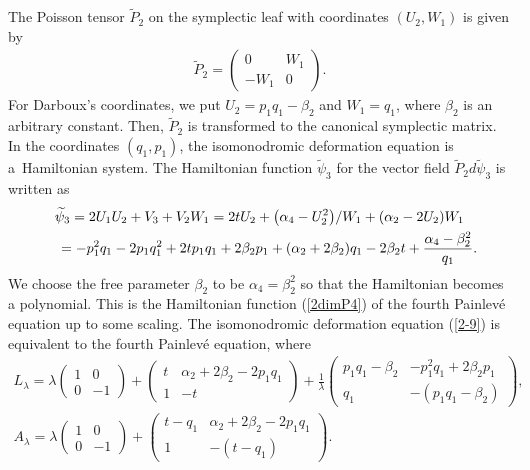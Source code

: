\documentclass[10pt,a4paper]{amsart}
\numberwithin{equation}{section}
\begin{document}
The Poisson tensor $\widetilde{P}_2$ on the symplectic leaf with coordinates $(U_2,W_1)$ is given by
\begin{gather*}
\widetilde{P}_2 = \left(
\begin{matrix}
0 & W_1 \\
-W_1 & 0
\end{matrix}
\right).
\end{gather*}
For Darboux's coordinates, we put $U_2 = p_1q_1 - \beta_2$ and $W_1 = q_1$, where $\beta_2$ is an arbitrary constant. Then, $\widetilde{P}_2$ is transformed to the canonical symplectic matrix. In the coordinates $(q_1, p_1)$, the isomonodromic deformation equation is a~Hamiltonian system. The Hamiltonian function $\widetilde{\psi}_3$ for the vector f\/ield $\widetilde{P}_2d\widetilde{\psi}_3$ is written as
\begin{gather*}
\widetilde{\psi}_3 = 2U_1U_2 + V_3 + V_2W_1 = 2t U_2 + \big(\alpha _4-U_2^2\big)/W_1 + (\alpha _2 - 2U_2)W_1 \\
\hphantom{\widetilde{\psi}_3}{} = -p_1^2 q_1 - 2p_1q_1^2 + 2t p_1q_1 + 2\beta_2 p_1 + (\alpha _2 + 2\beta_2) q_1 - 2\beta_2 t + \frac{\alpha _4-\beta_2^2}{q_1}.
\end{gather*}
We choose the free parameter $\beta_2$ to be $\alpha _4 = \beta_2^2$ so that the Hamiltonian becomes a polynomial.
This is the Hamiltonian function (\ref{2dimP4}) of the fourth Painlev\'{e} equation up to some scaling.
The isomonodromic deformation equation (\ref{2-9}) is equivalent to the fourth Painlev\'{e} equation, where
\begin{gather*}
L_\lambda = \lambda \left(
\begin{matrix}
1 & 0 \\
0 & -1
\end{matrix}
\right) + \left(
\begin{matrix}
t & \alpha _2+2\beta_2 - 2p_1q_1 \\
1 & -t
\end{matrix}
\right) + \frac{1}{\lambda }\left(
\begin{matrix}
p_1q_1-\beta_2 & -p_1^2q_1+2\beta_2 p_1 \\
q_1 & -(p_1q_1-\beta_2)
\end{matrix}
\right), \\
A_\lambda = \lambda \left(
\begin{matrix}
1 & 0 \\
0 & -1
\end{matrix}
\right) + \left(
\begin{matrix}
t-q_1 & \alpha _2+2\beta_2 - 2p_1q_1 \\
1 & -(t-q_1)
\end{matrix}
\right).
\end{gather*}
\end{document}
